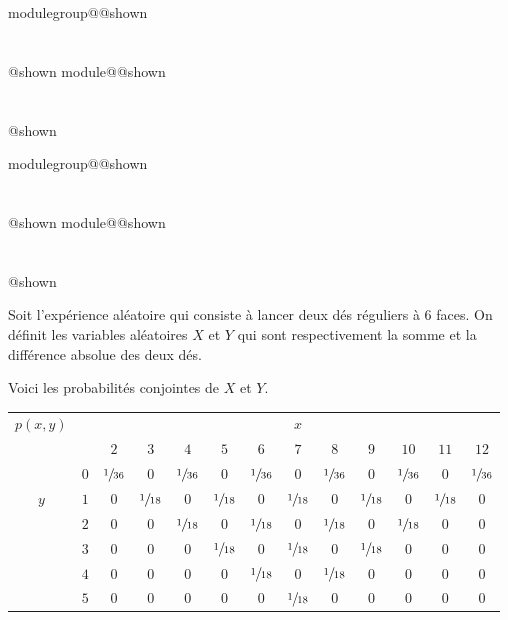 \documentclass{Evaluation}
\makeatletter
\newcommand{\currentmodulekey}{}
\newcommand{\currentmoduletitle}{}
\newcommand{\currentgroupkey}{}
\newcommand{\currentgrouptitle}{}
\newcommand{\showmoduleifneeded}{%
  \ifx\currentgroupkey\empty\else
    \expandafter\ifx\csname modulegroup@\currentgroupkey @shown\endcsname\relax
      \section*{\currentgrouptitle}%
      \expandafter\gdef\csname modulegroup@\currentgroupkey @shown\endcsname{1}%
    \fi
  \fi
  \expandafter\ifx\csname module@\currentmodulekey @shown\endcsname\relax
    \section*{\currentmoduletitle}%
    \expandafter\gdef\csname module@\currentmodulekey @shown\endcsname{1}%
  \fi
}
\newenvironment{H25}{\showmoduleifneeded}{}
\newenvironment{H26}{\showmoduleifneeded}{}
\makeatother
\begin{document}
\begin{questions}
\begin{H25}
\end{H25}

\begin{H26}
\question {} %
Soit l'expérience aléatoire qui consiste à lancer deux dés réguliers à 6 faces. 
On définit les variables aléatoires $X$ et $Y$ qui sont respectivement la somme et la différence absolue des deux dés.

Voici les probabilités conjointes de $X$ et $Y$.

\begin{center}

\begin{tabular}{cc|*{11}{c}|}
$p(x,y)$ & & \multicolumn{11}{c|}{$x$}  \\
 & & $2$ & $3$ & $4$ & $5$ & $6$ & $7$ & $8$ & $9$ & $10$ & $11$ & $12$ \\
\hline
 & $0$ & $\sfrac{1}{36}$ & 0 & $\sfrac{1}{36}$ & 0  & $\sfrac{1}{36}$ &  0 & $\sfrac{1}{36}$ & 0  & $\sfrac{1}{36}$ & 0  & $\sfrac{1}{36}$ \\
$y$ & $1$ & 0  & $\sfrac{1}{18}$ &  0 & $\sfrac{1}{18}$ &   0& $\sfrac{1}{18}$ & 0  & $\sfrac{1}{18}$ &   0& $\sfrac{1}{18}$ & 0 \\
 & $2$ &  0 &  0 & $\sfrac{1}{18}$ &  0 & $\sfrac{1}{18}$ & 0  & $\sfrac{1}{18}$ & 0  & $\sfrac{1}{18}$ &0   & 0  \\
 & $3$ &  0 &  0 & 0  & $\sfrac{1}{18}$ & 0  & $\sfrac{1}{18}$ & 0  & $\sfrac{1}{18}$ & 0  &  0 & 0  \\
 & $4$ &  0 &  0 &  0 &0   & $\sfrac{1}{18}$ &  0 & $\sfrac{1}{18}$ &  0 & 0  &  0 & 0  \\
 & $5$ &  0 &  0 &   0& 0  &0   & $\sfrac{1}{18}$ & 0  & 0  &  0 & 0  &  0 \\
\hline


\end{tabular}
\end{center}
\end{H26}
\end{questions}
\end{document}
